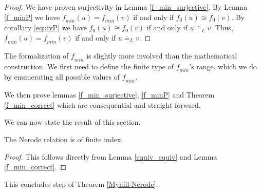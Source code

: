 \begin{proof}
    We have proven surjectivity in Lemma \ref{f_min_surjective}. 
    By Lemma \ref{f_minP} we have $\mathit{f_{min}}(u) = \mathit{f_{min}}(v)$ if and only if ${f_0}(u) \cong {f_0}(v)$.
    By corollary \ref{equivP} we have ${f_0}(u) \cong {f_0}(v)$ if and only if $u \doteq_L v$.
    Thus, $\mathit{f_{min}}(u) = \mathit{f_{min}}(v)$ if and only if $u \doteq_L v$.
\end{proof}


The formalization of $\mathit{f_{min}}$ is slightly more involved than the mathematical construction. 
We first need to define the finite type of $\mathit{f_{min}}$'s range, 
which we do by enumerating all possible values of $\mathit{f_{min}}$.



We then prove lemmas \ref{f_min_surjective}, \ref{f_minP} and Theorem \ref{f_min_correct} which are consequential and straight-forward.



We can now state the result of this section. 

\begin{corollary}
    The Nerode relation is of finite index.
\end{corollary}
\begin{proof}
    This follows directly from Lemma \ref{equiv_equiv} and Lemma \ref{f_min_correct}.
\end{proof}



This concludes step  of Theorem \ref{Myhill-Nerode}. 


